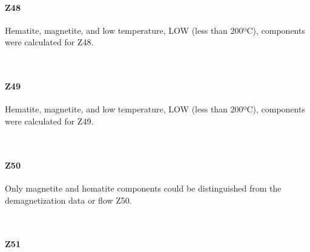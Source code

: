 \documentclass[11pt]{article}
\begin{document}
    \paragraph{Z48}\label{z48}

    Hematite, magnetite, and low temperature, LOW (less than 200ºC),
components were calculated for Z48.



    \begin{center}
    \end{center}
    { \hspace*{\fill} \\}
    
    \paragraph{Z49}\label{z49}

    Hematite, magnetite, and low temperature, LOW (less than 200ºC),
components were calculated for Z49.



    \begin{center}
    \end{center}
    { \hspace*{\fill} \\}
    
    \paragraph{Z50}\label{z50}

    Only magnetite and hematite components could be distinguished from the
demagnetization data or flow Z50.



    \begin{center}
    \end{center}
    { \hspace*{\fill} \\}
    
    \paragraph{Z51}\label{z51}
\end{document}

